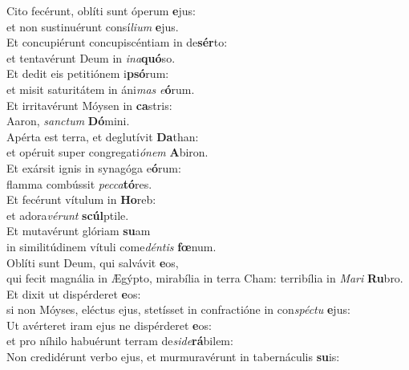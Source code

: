 \evenverse Cito fecérunt, oblíti sunt óperum \textbf{e}jus:~\*\\
\evenverse et non sustinuérunt consí\textit{li}\textit{um} \textbf{e}jus.\\
\oddverse Et concupiérunt concupiscéntiam in de\textbf{sér}to:~\*\\
\oddverse et tentavérunt Deum in \textit{i}\textit{na}\textbf{quó}so.\\
\evenverse Et dedit eis petitiónem i\textbf{psó}rum:~\*\\
\evenverse et misit saturitátem in áni\textit{mas} \textit{e}\textbf{ó}rum.\\
\oddverse Et irritavérunt Móysen in \textbf{ca}stris:~\*\\
\oddverse Aaron, \textit{san}\textit{ctum} \textbf{Dó}mini.\\
\evenverse Apérta est terra, et deglutívit \textbf{Da}than:~\*\\
\evenverse et opéruit super congregati\textit{ó}\textit{nem} \textbf{A}biron.\\
\oddverse Et exársit ignis in synagóga e\textbf{ó}rum:~\*\\
\oddverse flamma combússit \textit{pec}\textit{ca}\textbf{tó}res.\\
\evenverse Et fecérunt vítulum in \textbf{Ho}reb:~\*\\
\evenverse et adora\textit{vé}\textit{runt} \textbf{scúl}ptile.\\
\oddverse Et mutavérunt glóriam \textbf{su}am~\*\\
\oddverse in similitúdinem vítuli come\textit{dén}\textit{tis} \textbf{fœ}num.\\
\evenverse Oblíti sunt Deum, qui salvávit \textbf{e}os,~\*\\
\evenverse qui fecit magnália in Ægýpto, mirabília in terra Cham: terribília in \textit{Ma}\textit{ri} \textbf{Ru}bro.\\
\oddverse Et dixit ut dispérderet \textbf{e}os:~\*\\
\oddverse si non Móyses, eléctus ejus, stetísset in confractióne in con\textit{spé}\textit{ctu} \textbf{e}jus:\\
\evenverse Ut avérteret iram ejus ne dispérderet \textbf{e}os:~\*\\
\evenverse et pro níhilo habuérunt terram de\textit{si}\textit{de}\textbf{rá}bilem:\\
\oddverse Non credidérunt verbo ejus, et murmuravérunt in tabernáculis \textbf{su}is:~\*\\
